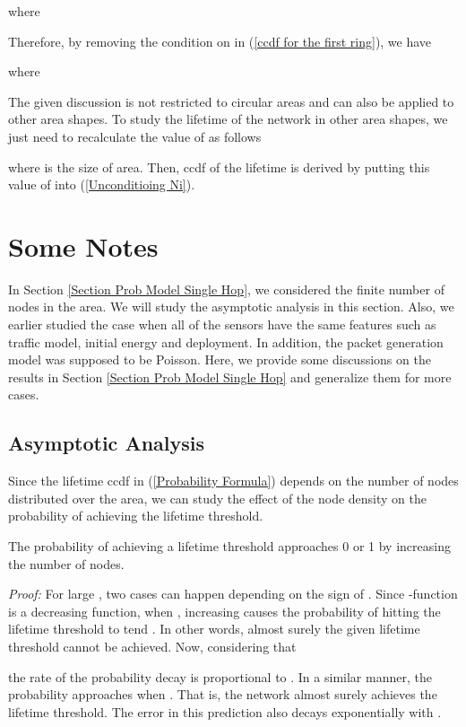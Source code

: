 \documentclass[conference]{IEEEtran}
\begin{document}
where

Therefore, by removing the condition on  in (\ref{ccdf for the
first ring}), we have

where


The given discussion is not restricted to circular areas and can
also be applied to other area shapes. To study the lifetime of the
network in other area shapes, we just need to recalculate the value
of  as follows

where  is the size of area. Then, ccdf of the lifetime is derived
by putting this value of  into (\ref{Unconditioing Ni}).

\section{Some Notes} \label{Section Extnesion}
In Section \ref{Section Prob Model Single Hop}, we considered the
finite number of nodes in the area. We will study the asymptotic
analysis in this section. Also, we earlier studied the case when all
of the sensors have the same features such as traffic model, initial
energy and deployment. In addition, the packet generation model was
supposed to be Poisson. Here, we provide some discussions on the
results in Section \ref{Section Prob Model Single Hop} and
generalize them for more cases.

\subsection{Asymptotic Analysis}
Since the lifetime ccdf in (\ref{Probability Formula}) depends on
the number of nodes distributed over the area, we can study the
effect of the node density on the probability of achieving the
lifetime threshold.

\corol \label{Corollary on node density} The probability of
achieving a lifetime threshold approaches 0 or 1 by increasing the
number of nodes.

\textit{Proof:} For large , two cases can happen depending on the
sign of . Since -function is a decreasing
function, when , increasing  causes the probability of hitting the lifetime
threshold to tend . In other words, almost surely the
given lifetime threshold cannot be achieved. Now, considering that
\cite{Salehi_Commsystems}

the rate of the probability decay is proportional to . In a
similar manner, the probability approaches  when . That is, the network almost surely achieves the lifetime
threshold. The error in this prediction also decays exponentially
with . \hfill 
\end{document}
